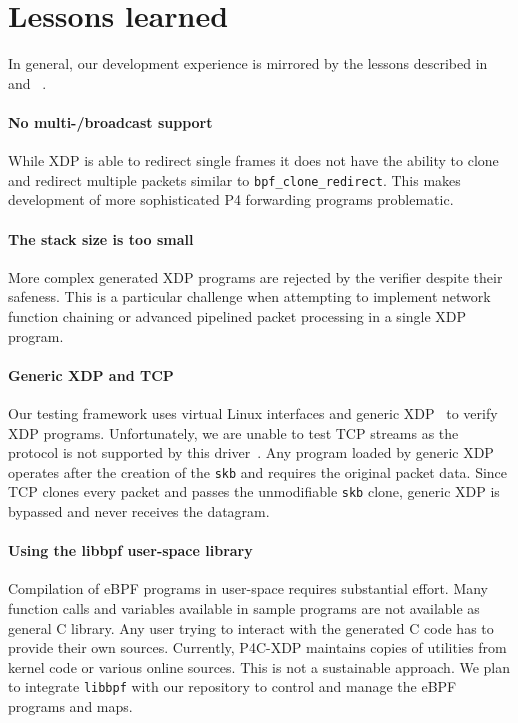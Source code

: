 \section{Lessons learned}\label{sec:conclusions}

In general, our development experience is mirrored by the lessons described
in~\cite{minao-hspr18} and ~\cite{bertin-netdev17}.

\paragraph{No multi-/broadcast support}
While XDP is able to redirect single frames it does not have the ability to 
clone and redirect multiple packets similar to \texttt{bpf\_clone\_redirect}. 
This makes development of more sophisticated P4 forwarding programs problematic.

\paragraph{The stack size is too small}
More complex generated XDP programs are rejected by the verifier despite their 
safeness. 
This is a particular challenge when attempting to implement network function 
chaining or advanced pipelined packet processing in a single XDP program. 

\paragraph{Generic XDP and TCP}
Our testing framework uses virtual Linux interfaces and generic 
XDP~\cite{genericxdp} to verify XDP programs. 
Unfortunately, we are unable to test TCP streams as the protocol is not 
supported by this driver~\cite{xdptcp}.
Any program loaded by generic XDP operates after the creation of
the \texttt{skb} and requires the original packet data. Since TCP clones every 
packet and passes the unmodifiable \texttt{skb} clone, generic XDP is
bypassed and never receives the datagram.

\paragraph{Using the libbpf user-space library}
Compilation of eBPF programs in user-space requires substantial 
effort. Many function calls and variables available in sample programs are not 
available as general C library. Any user trying to interact with the 
generated C code has to provide their own sources. Currently, P4C-XDP maintains 
copies of utilities from kernel code or various online sources. This is not a 
sustainable approach. We plan to integrate \texttt{libbpf} with our repository 
to control and manage the eBPF programs and maps.

